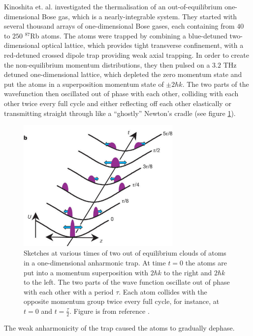 \documentclass[a4paper, 10pt]{article}
\theoremstyle{plain}
\begin{document}
Kinoshita et. al. investigated \cite{Kinoshita2006} the thermalisation of an
out-of-equilibrium one-dimensional Bose gas, which is a  nearly-integrable
system. They started with several thousand arrays of one-dimensional Bose gases,
each containing from $40$ to $250$ $^{87}$Rb atoms. The atoms were trapped by
combining a blue-detuned two-dimensional optical lattice, which provides tight 
transverse confinement, with a red-detuned crossed dipole
trap providing weak axial trapping. In order to create the non-equilibrium
momentum distributions, they then pulsed on a $3.2$ THz detuned one-dimensional
lattice, which depleted the zero momentum state and put the atoms in a
superposition momentum state of $\pm2\hbar k$. The two parts of the wavefunction
then oscillated out of phase with each other, colliding with each other twice
every full cycle and either reflecting off each other elastically or
transmitting straight through like a ``ghostly'' Newton's cradle (see figure 
\ref{fig:quantum_newtons_cradle}).
\begin{figure}[H]
    \begin{center}
        \includegraphics[width=8cm]{quantum_newtons_cradle}
    \end{center}
    \label{fig:quantum_newtons_cradle}
    \caption{Sketches at various times of two out of equilibrium clouds of atoms
             in a one-dimensional anharmonic trap. At time $t=0$ the atoms are
             put into a momentum superposition with $2\hbar k$ to the right and
             $2 \hbar k$ to the left. The two parts of the wave function
             oscillate out of phase with each other with a period $\tau$. Each
             atom collides with the opposite momentum group twice every full
             cycle, for instance, at $t=0$ and $t = \frac{\tau}{2}$. Figure is
             from reference \cite{Kinoshita2006}.}
\end{figure}
The weak anharmonicity of the trap caused the atoms to gradually dephase.
\end{document}
